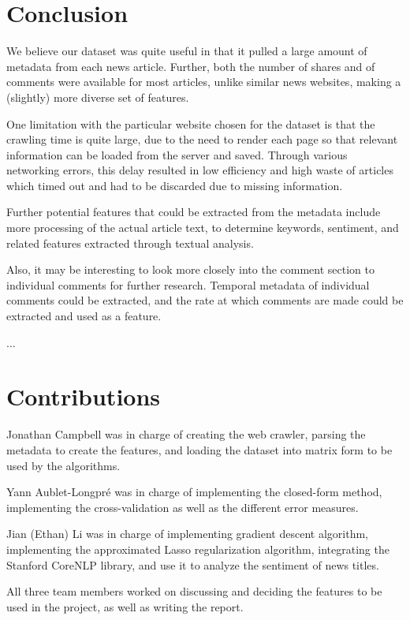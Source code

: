 \documentclass[conference,compsoc]{IEEEtran}
\begin{document}
\section{Conclusion}

We believe our dataset was quite useful in that it pulled a large amount of metadata from each news article. Further, both the number of shares and of comments were available for most articles, unlike similar news websites, making a (slightly) more diverse set of features.

One limitation with the particular website chosen for the dataset is that the crawling time is quite large, due to the need to render each page so that relevant information can be loaded from the server and saved. Through various networking errors, this delay resulted in low efficiency and high waste of articles which timed out and had to be discarded due to missing information.

Further potential features that could be extracted from the metadata include more processing of the actual article text, to determine keywords, sentiment, and related features extracted through textual analysis.

Also, it may be interesting to look more closely into the comment section to individual comments for further research. Temporal metadata of individual comments could be extracted, and the rate at which comments are made could be extracted and used as a feature.

...

\section{Contributions}

Jonathan Campbell was in charge of creating the web crawler, parsing the metadata to create the features, and loading the dataset into matrix form to be used by the algorithms.

Yann Aublet-Longpré was in charge of implementing the closed-form method, implementing the cross-validation as well as the different error measures.

Jian (Ethan) Li was in charge of implementing gradient descent algorithm, implementing the approximated Lasso regularization algorithm, integrating the Stanford CoreNLP library, and use it to analyze the sentiment of news titles.

All three team members worked on discussing and deciding the features to be used in the project, as well as writing the report.
\\
\end{document}
